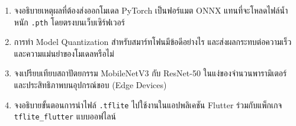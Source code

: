 \begin{enumerate}
    \item จงอธิบายเหตุผลที่ต้องส่งออกโมเดล PyTorch เป็นฟอร์แมต ONNX แทนที่จะโหลดไฟล์น้ำหนัก \texttt{.pth} โดยตรงบนเว็บเซิร์ฟเวอร์
    \item การทำ Model Quantization สำหรับสมาร์ทโฟนมีข้อดีอย่างไร และส่งผลกระทบต่อความเร็วและความแม่นยำของโมเดลหรือไม่
    \item จงเปรียบเทียบสถาปัตยกรรม MobileNetV3 กับ ResNet-50 ในแง่ของจำนวนพารามิเตอร์และประสิทธิภาพบนอุปกรณ์ขอบ (Edge Devices)
    \item จงอธิบายขั้นตอนการนำไฟล์ \texttt{.tflite} ไปใช้งานในแอปพลิเคชัน Flutter ร่วมกับแพ็กเกจ \texttt{tflite\_flutter} แบบออฟไลน์
\end{enumerate}

\clearpage
